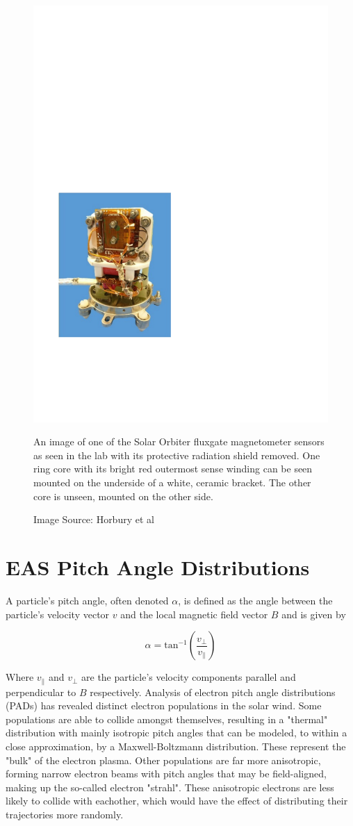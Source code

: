 \begin{figure}[h!]
    \centering
    \includegraphics[width=0.5\linewidth]{figures/magnetomato.pdf}
    \caption{An image of one of the Solar Orbiter fluxgate magnetometer sensors as seen in the lab with its protective radiation shield removed\cite{horbury2020}. One ring core with its bright red outermost sense winding can be seen mounted on the underside of a white, ceramic bracket. The other core is unseen, mounted on the other side.}
    \caption*{Image Source: Horbury et al\cite{horbury2020}}
    \label{fig: magnetomato}
\end{figure}

\section{EAS Pitch Angle Distributions} \label{EAS PAD}
A particle's pitch angle, often denoted \(\alpha\), is defined as the angle between the particle's velocity vector \(v\) and the local magnetic field vector \(B\) and is given by

\[\alpha=\textrm{tan}^{-1}(\frac{v_\perp}{v_\parallel})\]

Where \(v_\parallel\) and \(v_\perp\) are the particle's velocity components parallel and perpendicular to \(B\) respectively\cite{pilipp1987}. Analysis of electron pitch angle distributions (PADs) has revealed distinct electron populations in the solar wind. Some populations are able to collide amongst themselves, resulting in a "thermal" distribution with mainly isotropic pitch angles that  can be modeled, to within a close approximation, by a Maxwell-Boltzmann distribution. These represent the "bulk" of the electron plasma. Other populations are far more anisotropic, forming narrow electron beams with pitch angles that may be field-aligned, making up the so-called  electron "strahl". These anisotropic electrons are less likely to collide with eachother, which would have the effect of distributing their trajectories more randomly\cite{pilipp1987}\cite{marsch2006}.
\\

